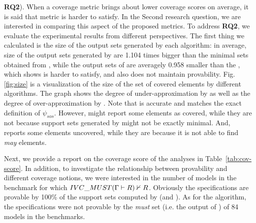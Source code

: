 \textbf{RQ2}). When a coverage metric brings about lower coverage scores on average,
it is said that metric is harder to satisfy. In the Second research question,
we are interested in comparing this aspect of the proposed metrics. To address \textbf{RQ2}, we evaluate the experimental results from different perspectives. The first thing we calculated is the size of the output sets generated by each algorithm: in average, size of the output sets generated by \ucalg are 1.104 times bigger than the minimal sets obtained from \ucbfalg, while the output sets of \mustalg are averagely 0.958 smaller than the \ucbfalg, which shows \mustalg is harder to satisfy, and also does not maintain provability. Fig. \ref{fig:size} is a visualization of the size of the set of covered elements by different algorithms. The graph shows the degree of under-approximation by \mustalg as well as the degree of over-approximation by \ucalg. 
Note that \ucbfalg is accurate and matches the exact definition of $\psi_{sos}$. However, \ucalg might report some elements as covered, while they are not because support sets generated by \ucalg might not be exactly minimal. And, \mustalg reports some elements uncovered, while they are because it is not able to find \emph{may} elements.

Next, we provide a report on the coverage score of the analyses in Table~\ref{tab:cov-score}. In addition, to investigate
the relationship between provability and different coverage notions,
we were interested in the number of models in the benchmark for which ${IVC\_MUST} (\Gamma \vdash R) \nvdash R$.
Obviously the specifications are provable by 100\% of the support sets computed by \ucalg (and \ucbfalg).
As for the \mustalg algorithm, the specifications were not provable by the \emph{must} set (i.e. the output of \mustalg) of 84 models in the benchmarks.


